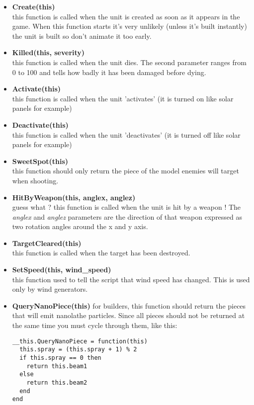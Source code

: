 \documentclass[a4paper,10pt]{article}
\begin{document}
\begin{itemize}
 \item \textbf{Create(this)}\\
  this function is called when the unit is created as soon as it appears in the game. When this function starts it's very unlikely (unless it's built instantly) the unit is built so don't animate it too early.

 \item \textbf{Killed(this, severity)}\\
  this function is called when the unit dies. The second parameter ranges from 0 to 100 and tells how badly it has been damaged before dying.

 \item \textbf{Activate(this)}\\
  this function is called when the unit 'activates' (it is turned on like solar panels for example)

 \item \textbf{Deactivate(this)}\\
  this function is called when the unit 'deactivates' (it is turned off like solar panels for example)

 \item \textbf{SweetSpot(this)}\\
  this function should only return the piece of the model enemies will target when shooting.

 \item \textbf{HitByWeapon(this, anglex, anglez)}\\
  guess what ? this function is called when the unit is hit by a weapon ! The \emph{anglex} and \emph{anglez} parameters are the direction of that weapon expressed as two rotation angles around the x and y axis.

 \item \textbf{TargetCleared(this)}\\
  this function is called when the target has been destroyed.

 \item \textbf{SetSpeed(this, wind\_speed)}\\
  this function used to tell the script that wind speed has changed. This is used only by wind generators.

 \item \textbf{QueryNanoPiece(this)}
  for builders, this function should return the pieces that will emit nanolathe particles. Since all pieces should not be returned at the same time you must cycle through them, like this:
  \begin{lstlisting}
__this.QueryNanoPiece = function(this)
  this.spray = (this.spray + 1) % 2
  if this.spray == 0 then
    return this.beam1
  else
    return this.beam2
  end
end
  \end{lstlisting}


\end{itemize}
\end{document}
